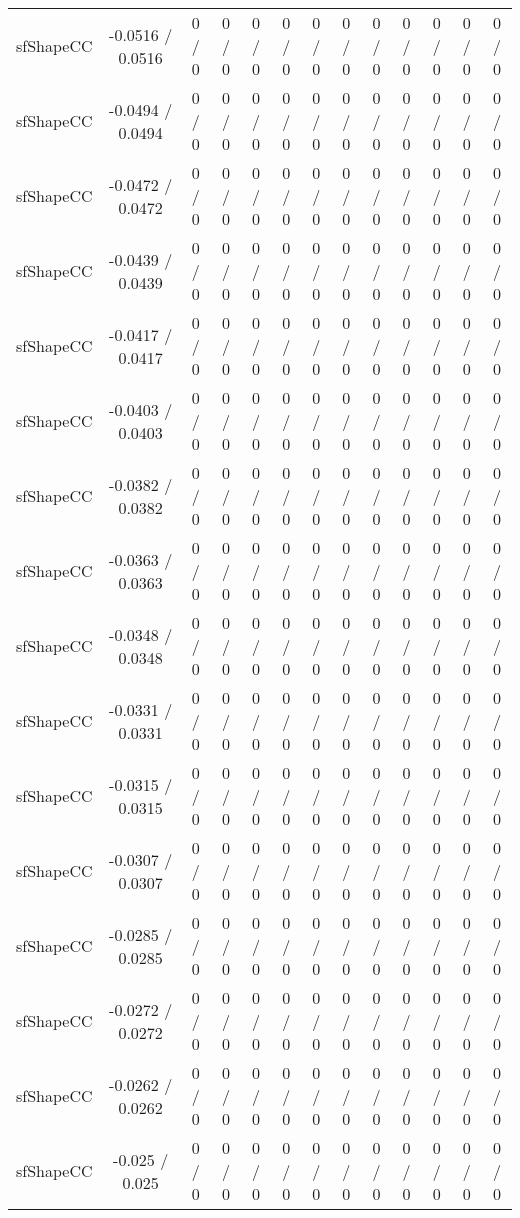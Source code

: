 \documentclass[10pt]{article}
\begin{document}
\begin{table}[htbp]
\begin{center}
\begin{tabular}{|c|c|c|c|c|c|c|c|c|c|c|c|c|}
  sfShapeCC & -0.0516 / 0.0516 & 0 / 0 & 0 / 0 & 0 / 0 & 0 / 0 & 0 / 0 & 0 / 0 & 0 / 0 & 0 / 0 & 0 / 0 & 0 / 0 & 0 / 0 \\ 
  sfShapeCC & -0.0494 / 0.0494 & 0 / 0 & 0 / 0 & 0 / 0 & 0 / 0 & 0 / 0 & 0 / 0 & 0 / 0 & 0 / 0 & 0 / 0 & 0 / 0 & 0 / 0 \\ 
  sfShapeCC & -0.0472 / 0.0472 & 0 / 0 & 0 / 0 & 0 / 0 & 0 / 0 & 0 / 0 & 0 / 0 & 0 / 0 & 0 / 0 & 0 / 0 & 0 / 0 & 0 / 0 \\ 
  sfShapeCC & -0.0439 / 0.0439 & 0 / 0 & 0 / 0 & 0 / 0 & 0 / 0 & 0 / 0 & 0 / 0 & 0 / 0 & 0 / 0 & 0 / 0 & 0 / 0 & 0 / 0 \\ 
  sfShapeCC & -0.0417 / 0.0417 & 0 / 0 & 0 / 0 & 0 / 0 & 0 / 0 & 0 / 0 & 0 / 0 & 0 / 0 & 0 / 0 & 0 / 0 & 0 / 0 & 0 / 0 \\ 
  sfShapeCC & -0.0403 / 0.0403 & 0 / 0 & 0 / 0 & 0 / 0 & 0 / 0 & 0 / 0 & 0 / 0 & 0 / 0 & 0 / 0 & 0 / 0 & 0 / 0 & 0 / 0 \\ 
  sfShapeCC & -0.0382 / 0.0382 & 0 / 0 & 0 / 0 & 0 / 0 & 0 / 0 & 0 / 0 & 0 / 0 & 0 / 0 & 0 / 0 & 0 / 0 & 0 / 0 & 0 / 0 \\ 
  sfShapeCC & -0.0363 / 0.0363 & 0 / 0 & 0 / 0 & 0 / 0 & 0 / 0 & 0 / 0 & 0 / 0 & 0 / 0 & 0 / 0 & 0 / 0 & 0 / 0 & 0 / 0 \\ 
  sfShapeCC & -0.0348 / 0.0348 & 0 / 0 & 0 / 0 & 0 / 0 & 0 / 0 & 0 / 0 & 0 / 0 & 0 / 0 & 0 / 0 & 0 / 0 & 0 / 0 & 0 / 0 \\ 
  sfShapeCC & -0.0331 / 0.0331 & 0 / 0 & 0 / 0 & 0 / 0 & 0 / 0 & 0 / 0 & 0 / 0 & 0 / 0 & 0 / 0 & 0 / 0 & 0 / 0 & 0 / 0 \\ 
  sfShapeCC & -0.0315 / 0.0315 & 0 / 0 & 0 / 0 & 0 / 0 & 0 / 0 & 0 / 0 & 0 / 0 & 0 / 0 & 0 / 0 & 0 / 0 & 0 / 0 & 0 / 0 \\ 
  sfShapeCC & -0.0307 / 0.0307 & 0 / 0 & 0 / 0 & 0 / 0 & 0 / 0 & 0 / 0 & 0 / 0 & 0 / 0 & 0 / 0 & 0 / 0 & 0 / 0 & 0 / 0 \\ 
  sfShapeCC & -0.0285 / 0.0285 & 0 / 0 & 0 / 0 & 0 / 0 & 0 / 0 & 0 / 0 & 0 / 0 & 0 / 0 & 0 / 0 & 0 / 0 & 0 / 0 & 0 / 0 \\ 
  sfShapeCC & -0.0272 / 0.0272 & 0 / 0 & 0 / 0 & 0 / 0 & 0 / 0 & 0 / 0 & 0 / 0 & 0 / 0 & 0 / 0 & 0 / 0 & 0 / 0 & 0 / 0 \\ 
  sfShapeCC & -0.0262 / 0.0262 & 0 / 0 & 0 / 0 & 0 / 0 & 0 / 0 & 0 / 0 & 0 / 0 & 0 / 0 & 0 / 0 & 0 / 0 & 0 / 0 & 0 / 0 \\ 
  sfShapeCC & -0.025 / 0.025 & 0 / 0 & 0 / 0 & 0 / 0 & 0 / 0 & 0 / 0 & 0 / 0 & 0 / 0 & 0 / 0 & 0 / 0 & 0 / 0 & 0 / 0 \\ 

\end{tabular}
\end{center}
\end{table}
\end{document}
